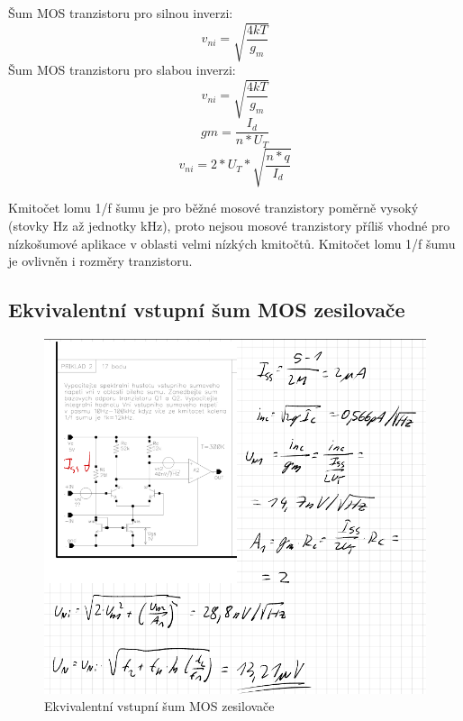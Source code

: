 Šum MOS tranzistoru pro silnou inverzi:
\begin{equation}
v_{ni}=\sqrt{\frac{4kT}{g_{m}}}
\end{equation}
Šum MOS tranzistoru pro slabou inverzi:
\begin{equation}
v_{ni}=\sqrt{\frac{4kT}{g_{m}}}
\end{equation}
\begin{equation}
gm = \frac{I_{d}}{n*U_{T}}
\end{equation}
\begin{equation}
v_{ni}=2*U_{T}*\sqrt{\frac{n*q}{I_{d}}}
\end{equation}

Kmitočet lomu 1/f šumu je pro běžné mosové tranzistory poměrně vysoký (stovky Hz až
jednotky kHz), proto nejsou mosové tranzistory příliš vhodné pro nízkošumové aplikace
v oblasti velmi nízkých kmitočtů. Kmitočet lomu 1/f šumu je ovlivněn i rozměry tranzistoru.

\subsection{Ekvivalentní vstupní šum MOS zesilovače}
\begin{figure}[h]
   \begin{center}
     \includegraphics[scale=0.7]{images/vstupMOS1.png}
   \end{center}
   \caption{Ekvivalentní vstupní šum MOS zesilovače}
\end{figure}

